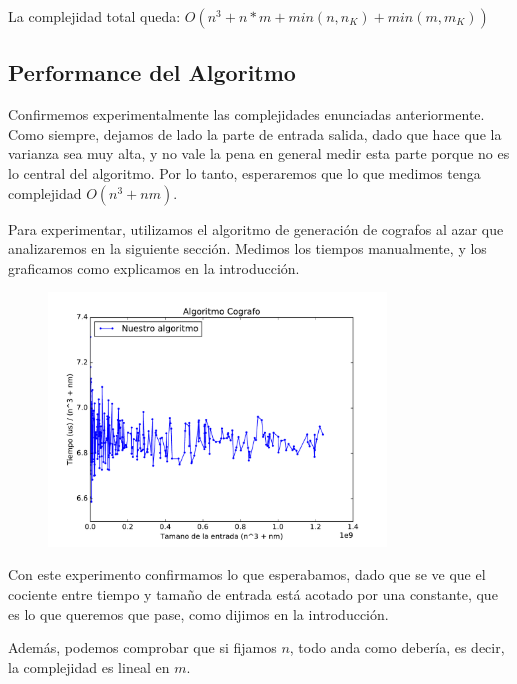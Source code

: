 La complejidad total queda: 
$O( n^3 + n*m + min( n, n_K) + min (m, m_K) )$

\subsection{Performance del Algoritmo}

Confirmemos experimentalmente las complejidades enunciadas anteriormente. Como siempre, dejamos de lado la parte de entrada salida, dado que hace que la varianza sea muy alta, y no vale la pena en general medir esta parte porque no es lo central del algoritmo. Por lo tanto, esperaremos que lo que medimos tenga complejidad $O(n^3 + nm)$. 

Para experimentar, utilizamos el algoritmo de generación de cografos al azar que analizaremos en la siguiente sección. Medimos los tiempos manualmente, y los graficamos como explicamos en la introducción. 

\begin{figure}[H]
 \centering
	\includegraphics[width=0.8\textwidth]{graficos/problema_3/tiempos0.pdf}
	\caption{}
	\label{fig:problema3-tiempos0}
\end{figure}

Con este experimento confirmamos lo que esperabamos, dado que se ve que el cociente entre tiempo y tamaño de entrada está acotado por una constante, que es lo que queremos que pase, como dijimos en la introducción.

Además, podemos comprobar que si fijamos $n$, todo anda como debería, es decir, la complejidad es lineal en $m$.

